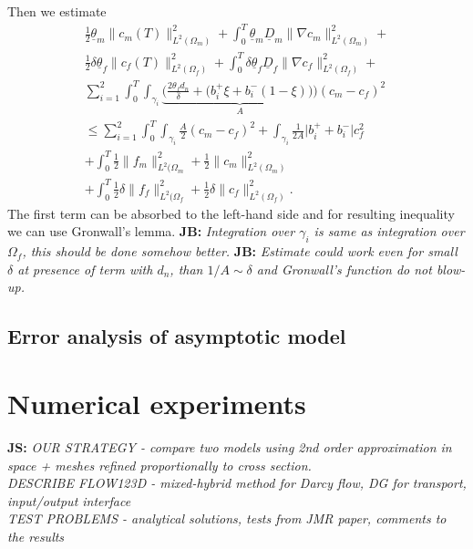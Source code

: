 \documentclass[a4paper]{article}
\def\abs#1{\lvert#1\rvert}
\def\grad{\nabla}
\def\norm#1{\|#1\|}
\newcommand{\note}[2]{{\color{blue} \textbf{ #1:} \textit{#2}}}
\begin{document}
Then we estimate
\def\ul{\underline}
\begin{align*}
  \frac12 \ul{\theta}_m\norm{c_m(T)}_{L^2(\Omega_m)}^2 + \int_0^T \ul{\theta}_m \ul{D}_m \norm{\grad c_m}_{L^2(\Omega_m)}^2 + \\
  \frac12 \delta\ul{\theta}_f\norm{c_f(T)}_{L^2(\Omega_f)}^2 + \int_0^T \delta \ul{\theta}_f \ul{D}_f \norm{\grad c_f}_{L^2(\Omega_f)}^2+\\
   \sum_{i=1}^{2} \int_0^T \int_{\gamma_i} \underbrace{\Big(\frac{2\theta_f d_n}{\delta} + \big(b_i^+ \xi + b_i^-(1-\xi)\big)\Big)}_{A} (c_m-c_f)^2\\
   \le \sum_{i=1}^2 \int_0^T \int_{\gamma_i} \frac{A}{2} (c_m-c_f)^2 + \int_{\gamma_i} \frac{1}{2A}\abs{b_i^+ + b_i^-} c_f^2 \\
   + \int_0^T \frac12\norm{f_m}^2_{L^2(\Omega_m} + \frac12\norm{c_m}^2_{L^2(\Omega_m)}\\
   + \int_0^T \frac12\delta\norm{f_f}^2_{L^2(\Omega_f} + \frac12\delta\norm{c_f}^2_{L^2(\Omega_f)}.
\end{align*}
The first term can be absorbed to the left-hand side and for resulting inequality we can use Gronwall's lemma. 
\note{JB}{Integration over $\gamma_i$ is same as integration over $\Omega_f$, this should be done somehow better.}
\note{JB}{
Estimate could work even for small $\delta$ at presence of term with $d_n$, than $1/A \sim \delta$ and Gronwall's function do not blow-up.}



\subsection{Error analysis of asymptotic model}



\section{Numerical experiments}
\label{sc:numerics}

\note{JS}{
OUR STRATEGY - compare two models using 2nd order approximation in space + meshes refined proportionally to cross section.
\\
DESCRIBE FLOW123D - mixed-hybrid method for Darcy flow, DG for transport, input/output interface
\\
TEST PROBLEMS - analytical solutions, tests from JMR paper, comments to the results
}














%





\end{document}
